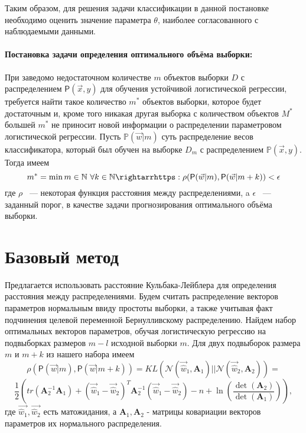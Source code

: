 \documentclass[12pt,twoside]{article}
\begin{document}
Таким образом, для решения задачи классификации в данной постановке необходимо
оценить значение параметра $\theta$, наиболее согласованного с наблюдаемыми данными.

\paragraph{Постановка задачи определения оптимального объёма выборки:}
При заведомо недостаточном количестве $m$ объектов выборки $D$ с распределением $\mathsf{P}(\vec{x},y)$ для обучения устойчивой логистической регрессии, требуется найти такое количество $m^*$ объектов выборки, которое будет достаточным и, кроме того никакая другая выборка с количеством объектов $M^*$ большей $m^*$ не приносит новой информации о распределении параметровом логистической регрессии.
 Пусть $\mathbb{P}(\vec{w}|m)$ суть распределение  весов классификатора, который был обучен на выборке $D_m$ с распределением $\mathbb{P}(\vec{x},y)$. Тогда имеем $$ m^* = \min m \in \mathbb{N} ~ \forall k \in \mathbb{N} \rightarrhttps: \rho (\mathsf{P}(\vec{w}|m), \mathsf{P}(\vec{w}|m+k)) < \epsilon$$где $\rho$ ~--- некоторая функция расстояния между распределениями, a $\epsilon$ ~--- заданный порог, в качестве задачи  прогнозирования оптимального объёма выборки. 
\subsection{}
\section{Базовый метод}
Предлагается использовать расстояние Кульбака-Лейблера для определения расстояния между распределениями.
Будем считать распределение векторов параметров нормальным ввиду простоты выборки, а также учитывая факт подчинения целевой переменной Бернулливскому распределению. Найдем набор оптимальных векторов параметров, обучая логистическую регрессию на подвыборках размеров $m-l$ исходной выборки $m$. Для двух подвыборок размера $m$ и $m+k$ из нашего набора имеем
$$\rho (\mathsf{P}(\vec{w}|m), \mathsf{P}(\vec{w}|m+k)) = KL(\mathcal{N}(\vec{\hat w}_1, \boldsymbol{A}_1)||\mathcal{N}(\vec{\hat w}_2, \boldsymbol{A}_2)) =$$
 $$\frac{1}{2}\left( tr(\boldsymbol{A}_2^{-1} \boldsymbol{A}_1) + (\vec{\hat w}_1 - \vec{\hat w}_2)^T \boldsymbol{A}_2^{-1}(\vec{\hat w}_1 - \vec{\hat w}_2) - n + \ln\left(\frac{\det(\boldsymbol{A}_2)}{\det(\boldsymbol{A}_1)}\right) \right),$$
 где $\vec{\hat w_1},\vec{\hat w_2}$ есть матожидания, а $\boldsymbol{A}_1, \boldsymbol{A}_2$ - матрицы ковариации
 векторов параметров их нормального распределения.
\end{document}
